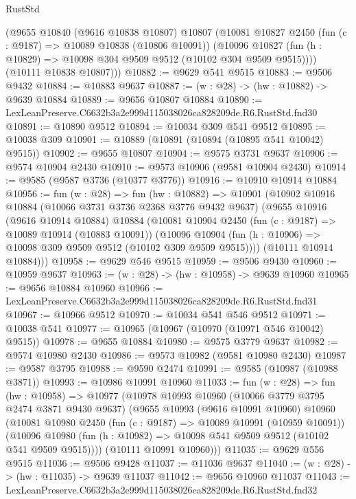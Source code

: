 \begin{lexlean}{RustStd}
\begin{coremodule}
      (@9655
        @10840
        (@9616 @10838 @10807)
        @10807
        (@10081
          @10827
          @2450
          (fun (c : @9187) => @10089 @10838 (@10806 @10091))
          (@10096 @10827 (fun (h : @10829) => @10098 @304 @9509 @9512 (@10102 @304 @9509 @9515))))
        (@10111 @10838 @10807)))
@10882 := @9629 @541 @9515
@10883 := @9506 @9432
@10884 := @10883 @9637
@10887 := (w : @28) -> (hw : @10882) -> @9639 @10884
@10889 := @9656 @10807 @10884
@10890 := LexLeanPreserve.C6632b3a2e999d115038026ca828209de.R6.RustStd.fnd30
@10891 := @10890 @9512
@10894 := @10034 @309 @541 @9512
@10895 := @10038 @309
@10901 := @10889 (@10891 (@10894 (@10895 @541 @10042) @9515))
@10902 := @9655 @10807
@10904 := @9575 @3731 @9637
@10906 := @9574 @10904 @2430
@10910 := @9573 @10906 (@9581 @10904 @2430)
@10914 := @9585 (@9587 @3736 (@10377 @3776))
@10916 := @10910 @10914 @10884
@10956 := fun (w : @28) =>
  fun (hw : @10882) =>
  @10901
    (@10902
      @10916
      @10884
      (@10066 @3731 @3736 @2368 @3776 @9432 @9637)
      (@9655
        @10916
        (@9616 @10914 @10884)
        @10884
        (@10081
          @10904
          @2450
          (fun (c : @9187) => @10089 @10914 (@10883 @10091))
          (@10096 @10904 (fun (h : @10906) => @10098 @309 @9509 @9512 (@10102 @309 @9509 @9515))))
        (@10111 @10914 @10884)))
@10958 := @9629 @546 @9515
@10959 := @9506 @9430
@10960 := @10959 @9637
@10963 := (w : @28) -> (hw : @10958) -> @9639 @10960
@10965 := @9656 @10884 @10960
@10966 := LexLeanPreserve.C6632b3a2e999d115038026ca828209de.R6.RustStd.fnd31
@10967 := @10966 @9512
@10970 := @10034 @541 @546 @9512
@10971 := @10038 @541
@10977 := @10965 (@10967 (@10970 (@10971 @546 @10042) @9515))
@10978 := @9655 @10884
@10980 := @9575 @3779 @9637
@10982 := @9574 @10980 @2430
@10986 := @9573 @10982 (@9581 @10980 @2430)
@10987 := @9587 @3795
@10988 := @9590 @2474
@10991 := @9585 (@10987 (@10988 @3871))
@10993 := @10986 @10991 @10960
@11033 := fun (w : @28) =>
  fun (hw : @10958) =>
  @10977
    (@10978
      @10993
      @10960
      (@10066 @3779 @3795 @2474 @3871 @9430 @9637)
      (@9655
        @10993
        (@9616 @10991 @10960)
        @10960
        (@10081
          @10980
          @2450
          (fun (c : @9187) => @10089 @10991 (@10959 @10091))
          (@10096 @10980 (fun (h : @10982) => @10098 @541 @9509 @9512 (@10102 @541 @9509 @9515))))
        (@10111 @10991 @10960)))
@11035 := @9629 @556 @9515
@11036 := @9506 @9428
@11037 := @11036 @9637
@11040 := (w : @28) -> (hw : @11035) -> @9639 @11037
@11042 := @9656 @10960 @11037
@11043 := LexLeanPreserve.C6632b3a2e999d115038026ca828209de.R6.RustStd.fnd32

\end{coremodule}
\end{lexlean}
